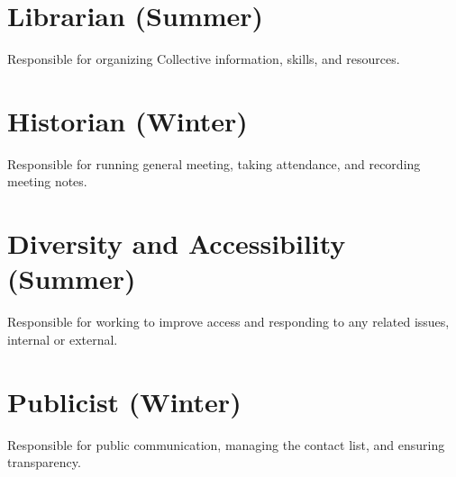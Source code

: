 \section[Librarian]{Librarian (Summer)}\label{sec:librarian}
Responsible for organizing Collective information, skills, and resources.

\section[Historian]{Historian (Winter)}\label{sec:historian}
Responsible for running general meeting, taking attendance, and recording meeting notes.

\section[Diversity and Accessibility]{Diversity and Accessibility (Summer)}\label{sec:accessability}
Responsible for working to improve access and responding to any related issues, internal or external.

\section[Publicist]{Publicist (Winter)}\label{sec:publicist}
Responsible for public communication, managing the contact list, and ensuring transparency.
